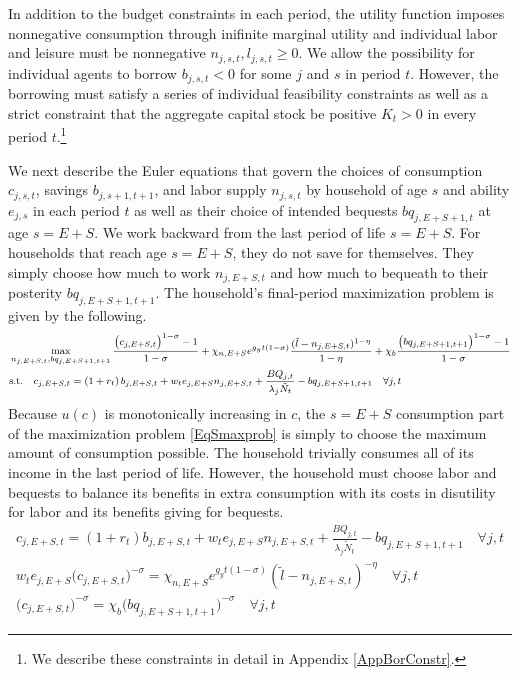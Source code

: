 \documentclass[letterpaper,12pt]{article}
\theoremstyle{definition}
\begin{document}
\begin{spacing}{1.5}
    In addition to the budget constraints in each period, the utility function imposes nonnegative consumption through inifinite marginal utility and individual labor and leisure must be nonnegative $n_{j,s,t},l_{j,s,t}\geq 0$. We allow the possibility for individual agents to borrow $b_{j,s,t}<0$ for some $j$ and $s$ in period $t$. However, the borrowing must satisfy a series of individual feasibility constraints as well as a strict constraint that the aggregate capital stock be positive $K_t>0$ in every period $t$.\footnote{We describe these constraints in detail in Appendix \ref{AppBorConstr}.}

    We next describe the Euler equations that govern the choices of consumption $c_{j,s,t}$, savings $b_{j,s+1,t+1}$, and labor supply $n_{j,s,t}$ by household of age $s$ and ability $e_{j,s}$ in each period $t$ as well as their choice of intended bequests $bq_{j,E+S+1,t}$ at age $s=E+S$. We work backward from the last period of life $s=E+S$. For households that reach age $s=E+S$, they do not save for themselves. They simply choose how much to work $n_{j,E+S,t}$ and how much to bequeath to their posterity $bq_{j,E+S+1,t+1}$. The household's final-period maximization problem is given by the following.
    \begin{equation}\label{EqSmaxprob}
      \footnotesize{\begin{split}
        &\max_{n_{j,E+S,t},bq_{j,E+S+1,t+1}} \frac{\left(c_{j,E+S,t}\right)^{1-\sigma} - 1}{1 - \sigma} + \chi_{n,E+S}e^{g_y t(1-\sigma)}\frac{(\tilde{l}-n_{j,E+S,t})^{1-\eta}}{1-\eta} + \chi_b\frac{\left(bq_{j,E+S+1,t+1}\right)^{1-\sigma} - 1}{1 - \sigma} \\
        &\text{s.t.} \quad c_{j,E+S,t} = \left(1 + r_t\right) b_{j,E+S,t} + w_t e_{j,E+S}n_{j,E+S,t} + \frac{BQ_{j,t}}{\lambda_j\tilde{N}_t} - bq_{j,E+S+1,t+1} \quad \forall j,t
      \end{split}}
    \end{equation}
    Because $u(c)$ is monotonically increasing in $c$, the $s=E+S$ consumption part of the maximization problem \eqref{EqSmaxprob} is simply to choose the maximum amount of consumption possible. The household trivially consumes all of its income in the last period of life. However, the household must choose labor and bequests to balance its benefits in extra consumption with its costs in disutility for labor and its benefits giving for bequests.
    \small{\begin{gather}
      c_{j,E+S,t} = \left(1 + r_t\right) b_{j,E+S,t} + w_t e_{j,E+S}n_{j,E+S,t} + \frac{BQ_{j,t}}{\lambda_j\tilde{N}_t} - bq_{j,E+S+1,t+1} \quad \forall j,t \label{EqScons} \\
      w_t e_{j,E+S}\bigl(c_{j,E+S,t}\bigr)^{-\sigma} = \chi_{n,E+S}e^{g_y t(1-\sigma)}(\tilde{l} - n_{j,E+S,t})^{-\eta} \quad\forall j,t \label{EqEulerSlab} \\
      \bigl(c_{j,E+S,t}\bigr)^{-\sigma} = \chi_b\bigl(bq_{j,E+S+1,t+1}\bigr)^{-\sigma} \quad\forall j,t \label{EqEulerSbeq}
    \end{gather}}


\end{spacing}
\end{document}
